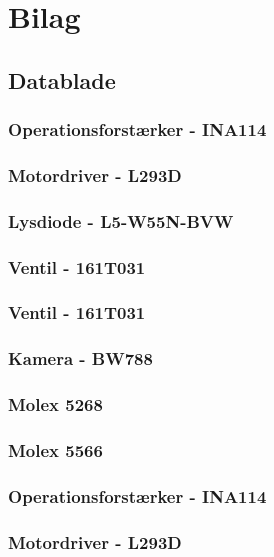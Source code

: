 \chapter{Bilag}
\section{Datablade}
\subsection{Operationsforstærker - INA114}
\label{bilag:INA114}

\subsection{Motordriver - L293D}
\label{bilag:L293D}

\subsection{Lysdiode - L5-W55N-BVW}
\label{bilag:L5-W55N-BVW}

\subsection{Ventil - 161T031}
\label{bilag:ventil}

\subsection{Ventil - 161T031}
\label{bilag:ventil}

\subsection{Kamera - BW788}

\subsection{Molex 5268}

\subsection{Molex 5566}\subsection{Operationsforstærker - INA114}
\label{bilag:INA114}

\subsection{Motordriver - L293D}
\label{bilag:L293D}

